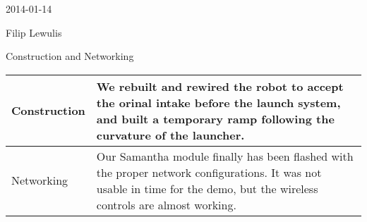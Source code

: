 2014-01-14

Filip Lewulis

Construction and Networking

\begin{tabular}{|p{5cm}|p{5cm}|}
\hline Construction &
We rebuilt and rewired the robot to accept the orinal intake before the launch system,
and built a temporary ramp following the curvature of the launcher. \\
\hline Networking &
Our Samantha module finally has been flashed with the proper network configurations. It
was not usable in time for the demo, but the wireless controls are almost working. \\
\hline
\end{tabular}